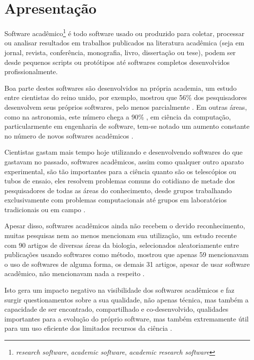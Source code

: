 
\section{Apresentação}

Software acadêmico\footnote{{\it research software}, {\it academic software},
{\it academic research software}} é todo software usado ou produzido para
coletar, processar ou analisar resultados em trabalhos publicados na literatura
acadêmica (seja em jornal, revista, conferência, monografia, livro, dissertação
ou tese), podem ser desde pequenos scripts ou protótipos até softwares
completos desenvolvidos profissionalmente.

Boa parte destes softwares são desenvolvidos na própria academia, um estudo
entre cientistas do reino unido, por exemplo, mostrou que 56\% dos
pesquisadores desenvolvem seus próprios softwares, pelo menos parcialmente
\cite{hettrick_2014_14809}. Em outras áreas, como na astronomia, este número
chega a 90\% \cite{momcheva2015software}, em ciência da computação,
particularmente em engenharia de software, tem-se notado um aumento constante
no número de novos softwares acadêmicos \cite{allen2017engineering}.

Cientistas gastam mais tempo hoje utilizando e desenvolvendo softwares do que
gastavam no passado, softwares acadêmicos, assim como qualquer outro aparato
experimental, são tão importantes para a ciência quanto são os telescópios ou
tubos de ensaio, eles resolvem problemas comuns do cotidiano de metade dos
pesquisadores de todas as áreas do conhecimento, desde grupos trabalhando
exclusivamente com problemas computacionais até grupos em laboratórios
tradicionais ou em campo \cite{wilson2014best}.

Apesar disso, softwares acadêmicos ainda não recebem o devido reconhecimento,
muitas pesquisas nem ao menos mencionam sua utilização, um estudo recente com
90 artigos de diversas áreas da biologia, selecionados aleatoriamente entre
publicações usando softwares como método, mostrou que apenas 59 mencionavam o
uso de softwares de alguma forma, os demais 31 artigos, apesar de usar software
acadêmico, não mencionavam nada a respeito \cite{howison2016software}.

Isto gera um impacto negativo na visibilidade dos softwares acadêmicos e faz
surgir questionamentos sobre a sua qualidade, não apenas técnica, mas também a
capacidade de ser encontrado, compartilhado e co-desenvolvido, qualidades
importantes para a evolução do próprio software, mas também extremamente útil
para um uso eficiente dos limitados recursos da ciência \cite{howison2013,
katz2014transitive}.

